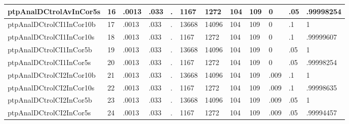 \begin{tabular}{|l|l|l|l|l|l|l|l|l|l|l|l|}
ptpAnalDCtrolAvInCor5s & 16 & .0013 & .033 & . & 1167 & 1272 & 104 & 109 & 0 & .05 & .99998254 \\ \hline 
ptpAnalDCtrolCI1InCor10b & 17 & .0013 & .033 & . & 13668 & 14096 & 104 & 109 & 0 & .1 & 1 \\ \hline 
ptpAnalDCtrolCI1InCor10s & 18 & .0013 & .033 & . & 1167 & 1272 & 104 & 109 & 0 & .1 & .99999607 \\ \hline 
ptpAnalDCtrolCI1InCor5b & 19 & .0013 & .033 & . & 13668 & 14096 & 104 & 109 & 0 & .05 & 1 \\ \hline 
ptpAnalDCtrolCI1InCor5s & 20 & .0013 & .033 & . & 1167 & 1272 & 104 & 109 & 0 & .05 & .99998254 \\ \hline 
ptpAnalDCtrolCI2InCor10b & 21 & .0013 & .033 & . & 13668 & 14096 & 104 & 109 & .009 & .1 & 1 \\ \hline 
ptpAnalDCtrolCI2InCor10s & 22 & .0013 & .033 & . & 1167 & 1272 & 104 & 109 & .009 & .1 & .99998635 \\ \hline 
ptpAnalDCtrolCI2InCor5b & 23 & .0013 & .033 & . & 13668 & 14096 & 104 & 109 & .009 & .05 & 1 \\ \hline 
ptpAnalDCtrolCI2InCor5s & 24 & .0013 & .033 & . & 1167 & 1272 & 104 & 109 & .009 & .05 & .99994457 \\ \hline 
  \end{tabular}
